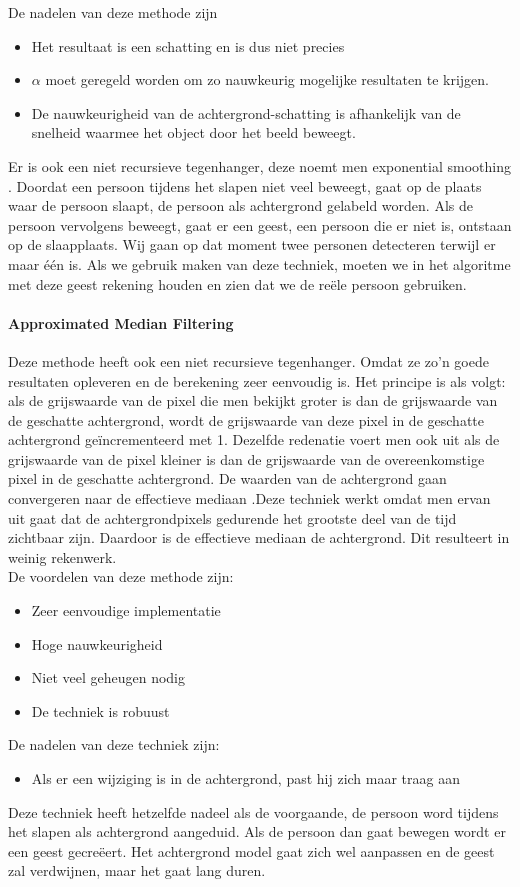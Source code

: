 De nadelen van deze methode zijn
\begin{itemize}
	\item Het resultaat is een schatting en is dus niet precies
	\item $\alpha$ moet geregeld worden om zo nauwkeurig mogelijke resultaten te krijgen.
	\item De nauwkeurigheid van de achtergrond-schatting is afhankelijk van de snelheid waarmee het object door het beeld beweegt.
\end{itemize}
Er is ook een niet recursieve tegenhanger, deze noemt men exponential smoothing \cite{bibSDB}. Doordat een persoon tijdens het slapen niet veel beweegt, gaat op de plaats waar de persoon slaapt, de persoon als achtergrond gelabeld worden. Als de persoon vervolgens beweegt, gaat er een geest, een persoon die er niet is, ontstaan op de slaapplaats. Wij gaan op dat moment twee personen detecteren terwijl er maar \'e\'en is. Als we gebruik maken van deze techniek, moeten we in het algoritme met deze geest rekening houden en zien dat we de re\"ele persoon gebruiken.

\paragraph{Approximated Median Filtering}
\label{refAMF}
Deze methode heeft ook een niet recursieve tegenhanger. Omdat ze zo'n goede resultaten opleveren en de berekening zeer eenvoudig is. Het principe is als volgt: als de grijswaarde van de pixel die men bekijkt groter is dan de grijswaarde van de geschatte achtergrond, wordt de grijswaarde van deze pixel in de geschatte achtergrond ge\"incrementeerd met 1. Dezelfde redenatie voert men ook uit als de grijswaarde van de pixel kleiner is dan de grijswaarde van de overeenkomstige pixel in de geschatte achtergrond. De waarden van de achtergrond gaan convergeren naar de effectieve mediaan \cite{bibVTS}.Deze techniek werkt omdat men ervan uit gaat dat de achtergrondpixels gedurende het grootste deel van de tijd zichtbaar zijn. Daardoor is de effectieve mediaan de achtergrond. Dit resulteert in weinig rekenwerk.\\
De voordelen van deze methode zijn:
\begin{itemize}
	\item Zeer eenvoudige implementatie
	\item Hoge nauwkeurigheid
	\item Niet veel geheugen nodig
	\item De techniek is robuust
\end{itemize} 
De nadelen van deze techniek zijn:
\begin{itemize}
	\item Als er een wijziging is in de achtergrond, past hij zich maar traag aan
\end{itemize}
Deze techniek heeft hetzelfde nadeel als de voorgaande, de persoon word tijdens het slapen als achtergrond aangeduid. Als de persoon dan gaat bewegen wordt er een geest gecre\"eert. Het achtergrond model gaat zich wel aanpassen en de geest zal verdwijnen, maar het gaat lang duren.

